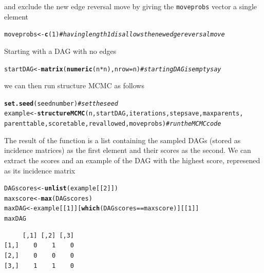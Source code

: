 \documentclass[a4paper]{article}\usepackage[]{graphicx}\usepackage[]{color}
\makeatletter
\newcommand{\hlnum}[1]{\textcolor[rgb]{0.686,0.059,0.569}{#1}}%
\newcommand{\hlcom}[1]{\textcolor[rgb]{0.678,0.584,0.686}{\textit{#1}}}%
\newcommand{\hlopt}[1]{\textcolor[rgb]{0,0,0}{#1}}%
\newcommand{\hlstd}[1]{\textcolor[rgb]{0.345,0.345,0.345}{#1}}%
\newcommand{\hlkwb}[1]{\textcolor[rgb]{0.69,0.353,0.396}{#1}}%
\newcommand{\hlkwc}[1]{\textcolor[rgb]{0.333,0.667,0.333}{#1}}%
\newcommand{\hlkwd}[1]{\textcolor[rgb]{0.737,0.353,0.396}{\textbf{#1}}}%
\newenvironment{kframe}{%
 \def\at@end@of@kframe{}%
 \ifinner\ifhmode%
  \def\at@end@of@kframe{\end{minipage}}%
  \begin{minipage}{\columnwidth}%
 \fi\fi%
 \def\FrameCommand##1{\hskip\@totalleftmargin \hskip-\fboxsep
 \colorbox{shadecolor}{##1}\hskip-\fboxsep
     \hskip-\linewidth \hskip-\@totalleftmargin \hskip\columnwidth}%
 \MakeFramed {\advance\hsize-\width
   \@totalleftmargin\z@ \linewidth\hsize
   \@setminipage}}%
 {\par\unskip\endMakeFramed%
 \at@end@of@kframe}
\newenvironment{knitrout}{}{} %
\newcommand{\nn}{\noindent}
\makeatother
\begin{document}
\nn and exclude the new edge reversal move by giving the \texttt{moveprobs} vector a single element

\begin{knitrout}
\color{fgcolor}\begin{kframe}
\begin{alltt}
\hlstd{moveprobs} \hlkwb{<-} \hlkwd{c}\hlstd{(}\hlnum{1}\hlstd{)}  \hlcom{# having length 1 disallows the new edge reversal move}
\end{alltt}
\end{kframe}
\end{knitrout}

\nn Starting with a DAG with no edges

\begin{knitrout}
\color{fgcolor}\begin{kframe}
\begin{alltt}
\hlstd{startDAG} \hlkwb{<-} \hlkwd{matrix}\hlstd{(}\hlkwd{numeric}\hlstd{(n} \hlopt{*} \hlstd{n),} \hlkwc{nrow} \hlstd{= n)}  \hlcom{# starting DAG is empty say}
\end{alltt}
\end{kframe}
\end{knitrout}

\nn we can then run structure MCMC as follows

\begin{knitrout}
\color{fgcolor}\begin{kframe}
\begin{alltt}
\hlkwd{set.seed}\hlstd{(seednumber)}  \hlcom{# set the seed}
\hlstd{example} \hlkwb{<-} \hlkwd{structureMCMC}\hlstd{(n, startDAG, iterations, stepsave, maxparents,}
    \hlstd{parenttable, scoretable, revallowed, moveprobs)}  \hlcom{# run the MCMC code}
\end{alltt}
\end{kframe}
\end{knitrout}

\nn The result of the function is a list containing the sampled DAGs (stored as incidence matrices) as the first element and their scores as the second.  We can extract the scores and an example of the DAG with the highest score, represened as its incidence matrix

\begin{knitrout}
\color{fgcolor}\begin{kframe}
\begin{alltt}
\hlstd{DAGscores} \hlkwb{<-} \hlkwd{unlist}\hlstd{(example[[}\hlnum{2}\hlstd{]])}
\hlstd{maxscore} \hlkwb{<-} \hlkwd{max}\hlstd{(DAGscores)}
\hlstd{maxDAG} \hlkwb{<-} \hlstd{example[[}\hlnum{1}\hlstd{]][}\hlkwd{which}\hlstd{(DAGscores} \hlopt{==} \hlstd{maxscore)][[}\hlnum{1}\hlstd{]]}
\hlstd{maxDAG}
\end{alltt}
\begin{verbatim}
     [,1] [,2] [,3]
[1,]    0    1    0
[2,]    0    0    0
[3,]    1    1    0
\end{verbatim}
\end{kframe}
\end{knitrout}
\end{document}

